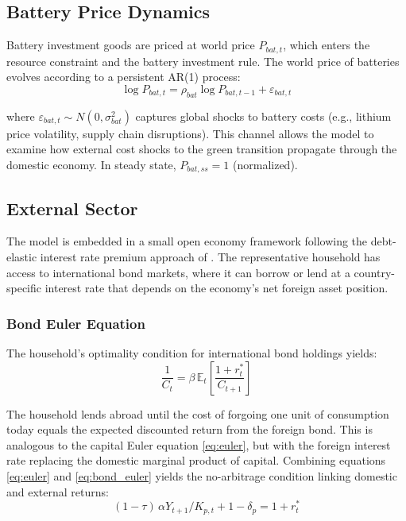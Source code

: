 \documentclass[12pt, a4paper]{article}
\begin{document}
	\subsection{Battery Price Dynamics}
	
	Battery investment goods are priced at world price $P_{bat,t}$, which enters the resource constraint and the battery investment rule. The world price of batteries evolves according to a persistent AR(1) process:
	\begin{equation}
		\log P_{bat,t} = \rho_{bat} \log P_{bat,t-1} + \varepsilon_{bat,t}
		\label{eq:battery_price_shock}
	\end{equation}
	
	where $\varepsilon_{bat,t} \sim N(0, \sigma^2_{bat})$ captures global shocks to battery costs (e.g., lithium price volatility, supply chain disruptions). This channel allows the model to examine how external cost shocks to the green transition propagate through the domestic economy. In steady state, $P_{bat,ss} = 1$ (normalized).
	
	\subsection{External Sector}
	
	The model is embedded in a small open economy framework following the debt-elastic interest rate premium approach of \citet{schmittgrohe2003}. The representative household has access to international bond markets, where it can borrow or lend at a country-specific interest rate that depends on the economy's net foreign asset position.
	
	\subsubsection{Bond Euler Equation}
	
	The household's optimality condition for international bond holdings yields:
	\begin{equation}
		\frac{1}{C_t} = \beta \, \mathbb{E}_t \left[ \frac{1 + r^*_t}{C_{t+1}} \right]
		\label{eq:bond_euler}
	\end{equation}
	
	The household lends abroad until the cost of forgoing one unit of consumption today equals the expected discounted return from the foreign bond. This is analogous to the capital Euler equation \eqref{eq:euler}, but with the foreign interest rate replacing the domestic marginal product of capital. Combining equations \eqref{eq:euler} and \eqref{eq:bond_euler} yields the no-arbitrage condition linking domestic and external returns:
	\begin{equation}
		(1-\tau)\,\alpha Y_{t+1}/K_{p,t} + 1 - \delta_p = 1 + r^*_t
		\label{eq:no_arbitrage}
	\end{equation}
	
\end{document}
